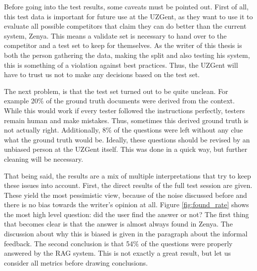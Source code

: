 Before going into the test results, some caveats must be pointed out. First of all, this test data is important for future use at the UZGent, as they want to use it to evaluate all possible competitors that claim they can do better than the current system, Zenya. This means a validate set is necessary to hand over to the competitor and a test set to keep for themselves. As the writer of this thesis is both the person gathering the data, making the split and also testing his system, this is something of a violation against best practices. Thus, the UZGent will have to trust us not to make any decisions based on the test set.

The next problem, is that the test set turned out to be quite unclean. For example 20\% of the ground truth documents were derived from the context. While this would work if every tester followed the instructions perfectly, testers remain human and make mistakes. Thus, sometimes this derived ground truth is not actually right. Additionally, 8\% of the questions were left without any clue what the ground truth would be. Ideally, these questions should be revised by an unbiased person at the UZGent itself. This was done in a quick way, but further cleaning will be necessary.

That being said, the results are a mix of multiple interpretations that try to keep these issues into account. First, the direct results of the full test session are given. These yield the most pessimistic view, because of the noise discussed before and there is no bias towards the writer's opinion at all. Figure \ref{fig:found_rate} shows the most high level question: did the user find the answer or not? The first thing that becomes clear is that the answer is almost always found in Zenya. The discussion about why this is biased is given in the paragraph about the informal feedback. The second conclusion is that 54\% of the questions were properly answered by the RAG system. This is not exactly a great result, but let us consider all metrics before drawing conclusions. 


